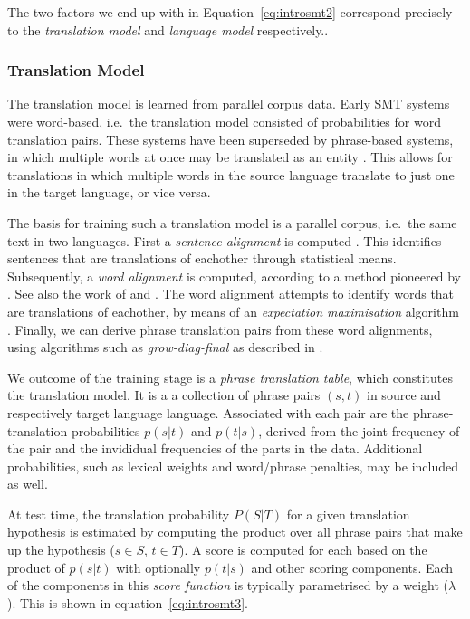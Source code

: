 The two factors we end up with in Equation~\ref{eq:introsmt2} correspond
precisely to the \emph{translation model} and \emph{language model}
respectively..

\subsubsection{Translation Model}

The translation model is learned from parallel corpus data. Early SMT systems
were word-based, i.e.\ the translation model consisted of probabilities for
word translation pairs. These systems have been superseded by phrase-based
systems, in which multiple words at once may be translated as an entity
\citep{PBSMT}. This allows for translations in which multiple words in the
source language translate to just one in the target language, or vice versa.

The basis for training such a translation model is a parallel corpus, i.e.\ the
same text in two languages. First a \emph{sentence alignment} is computed
\citep{TIEDEMANN}. This identifies sentences that are translations of eachother
through statistical means. Subsequently, a \emph{word alignment} is computed,
according to a method pioneered by \cite{BROWN}. See also the work of
\cite{OchNey2003} and \cite{TIEDEMANN}. The word alignment attempts to
identify words that are translations of eachother, by means of an
\emph{expectation maximisation} algorithm \citep{EXPMAX}. Finally, we can derive phrase
translation pairs from these word alignments, using algorithms such as
\emph{grow-diag-final} as described in \cite{PBSMT}. 

We outcome of the training stage is a \emph{phrase translation table}, which
constitutes the translation model. It is a a collection of phrase pairs $(s,t)$
in source and respectively target language language. Associated with each pair
are the phrase-translation probabilities $p(s|t)$ and $p(t|s)$, derived from
the joint frequency of the pair and the invididual frequencies of the parts in
the data. Additional probabilities, such as lexical weights and word/phrase
penalties, may be included as well. 

At test time, the translation probability $P(S|T)$ for a given translation
hypothesis is estimated by computing the product over all phrase pairs that
make up the hypothesis ($s \in S$, $t \in T$). A score is computed for each
based on the product of $p(s|t)$ with optionally $p(t|s)$ and other scoring
components. Each of the components in this \emph{score function} 
is typically parametrised by a weight ($\lambda$). This is shown in equation~\ref{eq:introsmt3}.

